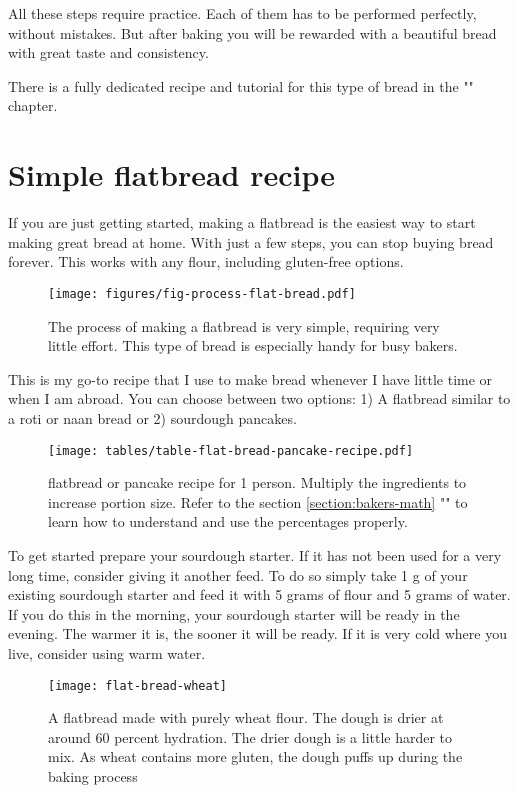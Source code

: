 All these steps require practice. Each of them has to be
performed perfectly, without mistakes.
But after baking you will be rewarded with a beautiful bread
with great taste and consistency.

There is a fully dedicated recipe and tutorial
for this type of bread in the "" chapter.

\section{Simple flatbread recipe}
\label{section:flat-bread-recipe}

If you are just getting started, making a flatbread is the
easiest way to start making great bread at home. With just a
few steps, you can stop buying bread forever. This works with
any flour, including gluten-free options.

\begin{figure}[!htb]
  \texttt{[image: figures/fig-process-flat-bread.pdf]}
  \caption{The process of making a flatbread is very simple, requiring very little effort. This
  type of bread is especially handy for busy bakers.}
  \label{fig:flat-bread-process}
\end{figure}

This is my go-to recipe that I use to make bread whenever
I have little time or when I am abroad. You can choose
between two options: 1) A flatbread similar to a roti or naan bread
or 2) sourdough pancakes.

\begin{figure}[!htb]
  \texttt{[image: tables/table-flat-bread-pancake-recipe.pdf]}
  \caption{\label{tab:flat-bread-ingredients}flatbread or pancake recipe for 1 person. Multiply the ingredients
  to increase portion size. Refer to the section \ref{section:bakers-math} "" to learn how
  to understand and use the percentages properly.}
\end{figure}

To get started prepare your sourdough starter. If it has not been used for a very
long time, consider giving it another feed. To do so simply take 1 g of your
existing sourdough starter and feed it with 5 grams of flour and 5 grams of water.
If you do this in the morning, your sourdough starter will be ready in the evening. The
warmer it is, the sooner it will be ready. If it is very cold where you live, consider
using warm water.

\begin{figure}[htb!]
  \texttt{[image: flat-bread-wheat]}
  \centering
  \caption{A flatbread made with purely wheat flour. The dough is drier
  at around 60 percent hydration.  The drier dough is a little harder
  to mix. As wheat contains more gluten, the dough puffs up during
  the baking process}
\end{figure}

